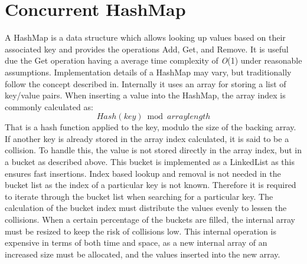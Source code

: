 \section{Concurrent HashMap}\label{app:hashmap}
A HashMap is a data structure which allows looking up values based on their associated key and provides the operations Add, Get, and Remove. It is useful due the Get operation having a average time complexity of \textit{O}(1) under reasonable assumptions\cite[p. 256]{cormen2009introduction}. Implementation details of a HashMap may vary, but traditionally follow the concept described in\cite[p. 256]{cormen2009introduction}. Internally it uses an array for storing a list of key/value pairs. When inserting a value into the HashMap, the  array index is commonly calculated as:
\begin{equation}
Hash(key) \bmod arraylength
\end{equation}
That is a hash function applied to the key, modulo the size of the backing array. If another key is already stored in the array index calculated, it is said to be a collision. To handle this, the value is not stored directly in the array index, but in a bucket as described above. This bucket is implemented as a LinkedList as this ensures fast insertions\cite[p. 257]{cormen2009introduction}. Index based lookup and removal is not needed in the bucket list as the index of a particular key is not known. Therefore it is required to iterate through the bucket list when searching for a particular key. The calculation of the bucket index must distribute the values evenly to lessen the collisions. When a certain percentage of the buckets are filled, the internal array must be resized to keep the risk of collisions low. This internal operation is expensive in terms of both time and space, as a new internal array of an increased size must be allocated, and the values inserted into the new array.

